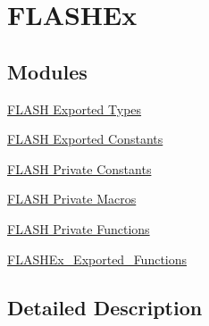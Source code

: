\hypertarget{group___f_l_a_s_h_ex}{}\section{F\+L\+A\+S\+H\+Ex}
\label{group___f_l_a_s_h_ex}
\subsection*{Modules}
\begin{DoxyCompactItemize}
\item 
\hyperlink{group___f_l_a_s_h_ex___exported___types}{F\+L\+A\+S\+H Exported Types}
\item 
\hyperlink{group___f_l_a_s_h_ex___exported___constants}{F\+L\+A\+S\+H Exported Constants}
\item 
\hyperlink{group___f_l_a_s_h_ex___private___constants}{F\+L\+A\+S\+H Private Constants}
\item 
\hyperlink{group___f_l_a_s_h_ex___private___macros}{F\+L\+A\+S\+H Private Macros}
\item 
\hyperlink{group___f_l_a_s_h_ex___private___functions}{F\+L\+A\+S\+H Private Functions}
\item 
\hyperlink{group___f_l_a_s_h_ex___exported___functions}{F\+L\+A\+S\+H\+Ex\+\_\+\+Exported\+\_\+\+Functions}
\end{DoxyCompactItemize}


\subsection{Detailed Description}
